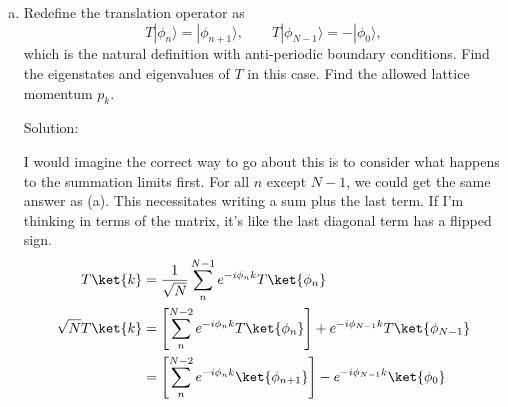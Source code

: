 \begin{homeworkProblem}
\begin{enumerate}[(a)]
\begin{callout}{Solution:}
                And because $TT^\dagger\ket{\phi_n} = \ket{\phi_n}$, and $\ket{\phi_n}$ diagonalizes a matrix, the translation operator is unitary and not just normal. Since it's unitary it will have the same eigenkets and eigenvalues with conjugate sign:
                \begin{align*}
                    \boxed{p_k = \text{exp}{\left(- \frac{i2\pi k}{N} \right)}
}
                \end{align*}

                \textit{One could also just say both chains return to the original state.}

            \end{callout}

            \newpage
        \item Redefine the translation operator as
            \[
                T|\phi_n\rangle = |\phi_{n+1}\rangle, \qquad T|\phi_{N-1}\rangle = -|\phi_0\rangle,
            \]
            which is the natural definition with anti-periodic boundary conditions. Find the eigenstates and eigenvalues of $T$ in this case. Find the allowed lattice momentum $p_k$.
            \begin{callout}{Solution:}

                I would imagine the correct way to go about this is to consider what happens to the summation limits first. For all $n$ except $N-1$, we could get the same answer as (a). This necessitates writing a sum plus the last term. If I'm thinking in terms of the matrix, it's like the last diagonal term has a flipped sign.
                \begin{align*}
                    T\ket{k} &= \frac{1}{\sqrt{N}} \sum_n^{N-1} e^{-i\phi_nk}T\ket{\phi_n} \\
                    \sqrt{N} T\ket{k} &= \left[\sum_n^{N-2} e^{-i\phi_nk}T\ket{\phi_n} \right] + e^{-i\phi_{N-1}k}T\ket{\phi_{N-1}} \\
                                      &= \left[\sum_n^{N-2} e^{-i\phi_{n}k}\ket{\phi_{n+1}} \right] - e^{-i\phi_{N-1}k}\ket{\phi_{0}}
                \end{align*}



\end{callout}
\end{enumerate}
\end{homeworkProblem}

